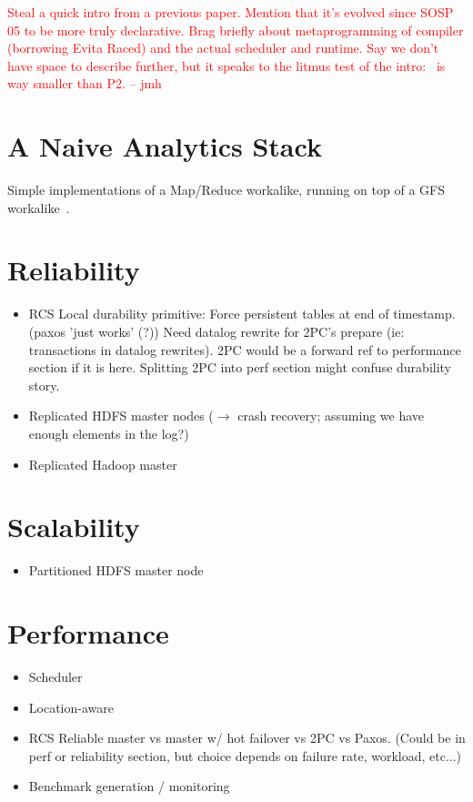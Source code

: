 \documentclass{sig-alternate}
\newcommand{\jmh}[1]{{\textcolor{red}{#1 -- jmh}}}
\begin{document}
\jmh{Steal a quick intro from a previous paper.  Mention that it's evolved since SOSP 05 to be more truly declarative.  Brag briefly about metaprogramming of compiler (borrowing Evita Raced) and the actual scheduler and runtime.  Say we don't have space to describe further, but it speaks to the litmus test of the intro: \JOL\ is way smaller than P2.}
\section{A Naive Analytics Stack}
Simple implementations of a Map/Reduce workalike, running on top of a
GFS workalike~\cite{gfs-sosp}.

\section{Reliability}
\begin{itemize}
\item
  RCS Local durability primitive: Force persistent tables at end of
  timestamp.  (paxos 'just works' (?)) Need datalog rewrite for 2PC's
  prepare (ie: transactions in datalog rewrites).  2PC would be a
  forward ref to performance section if it is here.  Splitting 2PC
  into perf section might confuse durability story.

\item
  Replicated HDFS master nodes ($\to$ crash recovery; assuming we have
  enough elements in the log?)

\item
  Replicated Hadoop master

\end{itemize}

\section{Scalability}
\begin{itemize}
\item
  Partitioned HDFS master node
\end{itemize}

\section{Performance}
\begin{itemize}
\item
  Scheduler
\item
  Location-aware
\item
  RCS Reliable master vs master w/ hot failover vs 2PC vs Paxos.  (Could be in perf or reliability section, but choice depends on failure rate, workload, etc...)
\item
  Benchmark generation / monitoring
\end{itemize}
\end{document}
